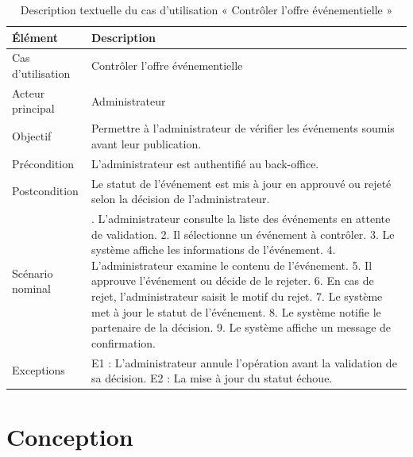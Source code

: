 \begin{table}[H]
\centering
\caption{Description textuelle du cas d’utilisation « Contrôler l’offre événementielle »}
\label{tableau:4-6}
\renewcommand{\arraystretch}{1.2}
\begin{tabularx}{\textwidth}{|>{\raggedright\arraybackslash}X|>{\raggedright\arraybackslash}X|}
\hline
\rowcolor[HTML]{ECF4FF}
\textbf{Élément} & \textbf{Description} \\
\hline
Cas d’utilisation & Contrôler l’offre événementielle \\
\hline
Acteur principal & Administrateur \\
\hline
Objectif & Permettre à l’administrateur de vérifier les événements soumis avant leur publication. \\
\hline
Précondition & L’administrateur est authentifié au back-office. \\
\hline
Postcondition & Le statut de l’événement est mis à jour en approuvé ou rejeté selon la décision de l’administrateur. \\
\hline
Scénario nominal & 1. L’administrateur consulte la liste des événements en attente de validation.\newline{} 2. Il sélectionne un événement à contrôler.\newline{} 3. Le système affiche les informations de l’événement.\newline{} 4. L’administrateur examine le contenu de l’événement.\newline{} 5. Il approuve l’événement ou décide de le rejeter.\newline{} 6. En cas de rejet, l’administrateur saisit le motif du rejet.\newline{} 7. Le système met à jour le statut de l’événement.\newline{} 8. Le système notifie le partenaire de la décision.\newline{} 9. Le système affiche un message de confirmation. \\
\hline
Exceptions & E1 : L’administrateur annule l’opération avant la validation de sa décision.\newline{} E2 : La mise à jour du statut échoue. \\
\hline
\end{tabularx}
\end{table}


\section{Conception}


